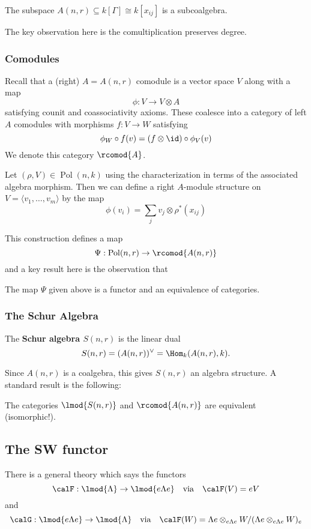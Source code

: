 \documentclass[12pt]{article}
\DeclareMathOperator{\Pol}{Pol}
\begin{document}
		\begin{thm}
			The subspace $A(n,r)\subseteq k[\Gamma]\cong k[x_{ij}]$ is a subcoalgebra.
		\end{thm}
		The key observation here is the comultiplication preserves degree.

		\subsubsection{Comodules}
		Recall that a (right) $A=A(n,r)$ comodule is a vector space $V$ along with a map 
		\[\phi:V\to V\otimes A\]
		satisfying counit and coassociativity axioms. These coalesce into a category of left $A$ comodules with morphisms 
		$f:V\to W$ satisfying 
		\[\phi_W\circ f(v)=(f\otimes \id)\circ \phi_V(v)\]
		We denote this category $\rcomod{A}$.

		Let $(\rho,V)\in \Pol(n,k)$ using the characterization in terms of the associated algebra morphism. Then 
		we can define a right $A$-module structure on $V=\langle v_1,\dots,v_m\rangle$ by the map 
		\[\phi(v_i)=\sum_jv_j\otimes \rho^\ast(x_{ij})\] 
		
		This construction defines a map
		\[\Psi:\Pol(n,r)\to \rcomod{A(n,r)}\] 
		and a key result here is the observation that 
		\begin{thm}
			The map $\Psi$ given above is a functor and an equivalence of categories.
		\end{thm}

		\subsubsection{The Schur Algebra}
		\begin{defn}
			The \textbf{Schur algebra $S(n,r)$} is the linear dual 
			\[S(n,r)=(A(n,r))^\vee=\Hom_k(A(n,r),k).\]
		\end{defn}
		Since $A(n,r)$ is a coalgebra, this gives $S(n,r)$ an algebra structure. A standard result is the following:
		\begin{thm}
			The categories $\lmod{S(n,r)}$ and $\rcomod{A(n,r)}$ are equivalent (isomorphic!).
		\end{thm}

	\subsection{The SW functor}
	There is a general theory which says the functors 
	\[\calF:\lmod{\Lambda}\to \lmod{e\Lambda e}\quad\text{via}\quad \calF(V)=eV\]
	and 
	\[\calG:\lmod{e\Lambda e}\to \lmod{\Lambda}\quad\text{via}\quad \calF(W)=\Lambda e\otimes_{e\Lambda e}W/(\Lambda e\otimes_{e\Lambda e}W)_e\]
\end{document}
